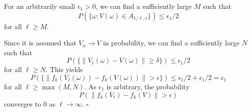 For an arbitrarily small $\epsilon_1>0$, we can find a sufficiently large $M$ such that
\[
P(\{\omega:V(\omega)\in A_{1/\ell,\epsilon}\})\leq \epsilon_1/2
\]
for all $\ell\geq M$.

Since it is assumed that $V_n\to V$ in probability, we can find a sufficiently large $N$ such that
\[
P(\{\lVert V_\ell(\omega)-V(\omega)\rVert\geq\delta\})\leq \epsilon_1/2
\]
for all $\ell\geq N$. This yields
\[
P(\{\lVert f_k(V_\ell(\omega))-f_k(V(\omega))\rVert>\epsilon\})
\leq \epsilon_1/2+\epsilon_1/2=\epsilon_1
\]
for all $\ell\geq \max(M,N)$. As $\epsilon_1$ is arbitrary, the probability
\[
P(\lVert f_k(V_\ell)-f_k(V)\rVert>\epsilon)
\]
converges to $0$ as $\ell\to\infty$.
\hfill $\square$
